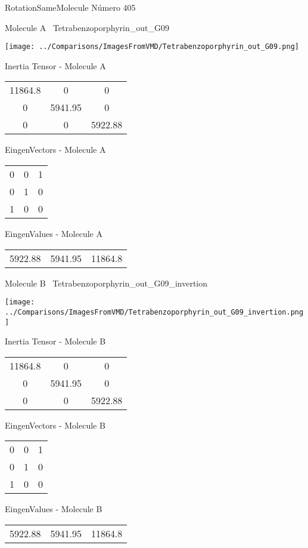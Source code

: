 \vtab[-3cm]
\begin{center}
{\large RotationSameMolecule \tab Número 405}
\end{center}
\begin{multicols}{2}
\begin{center}

Molecule A \
Tetrabenzoporphyrin\_out\_G09

\texttt{[image: ../Comparisons/ImagesFromVMD/Tetrabenzoporphyrin\_out\_G09.png]}

Inertia Tensor - Molecule A \\
\begin{tabular}{|c c c|}
11864.8	 & 	0	 & 	0	 \\
0	 & 	5941.95	 & 	0	 \\
0	 & 	0	 & 	5922.88
\end{tabular}

\vtab
 EingenVectors - Molecule A     \\
\begin{tabular}{|c c c|}
0	 & 	0	 & 	1	 \\
0	 & 	1	 & 	0	 \\
1	 & 	0	 & 	0
\end{tabular}

\vtab
 EingenValues - Molecule A     \\
\begin{tabular}{|c c c|}
5922.88	 & 	5941.95	 & 	11864.8	 \\
\end{tabular}
\columnbreak

Molecule B \
Tetrabenzoporphyrin\_out\_G09\_invertion

\texttt{[image: ../Comparisons/ImagesFromVMD/Tetrabenzoporphyrin\_out\_G09\_invertion.png]}

Inertia Tensor - Molecule B \\
\begin{tabular}{|c c c|}
11864.8	 & 	0	 & 	0	 \\
0	 & 	5941.95	 & 	0	 \\
0	 & 	0	 & 	5922.88
\end{tabular}

\vtab
 EingenVectors - Molecule B     \\
\begin{tabular}{|c c c|}
0	 & 	0	 & 	1	 \\
0	 & 	1	 & 	0	 \\
1	 & 	0	 & 	0
\end{tabular}

\vtab
 EingenValues - Molecule B     \\
\begin{tabular}{|c c c|}
5922.88	 & 	5941.95	 & 	11864.8	 \\
\end{tabular}

\end{center}
\end{multicols}

